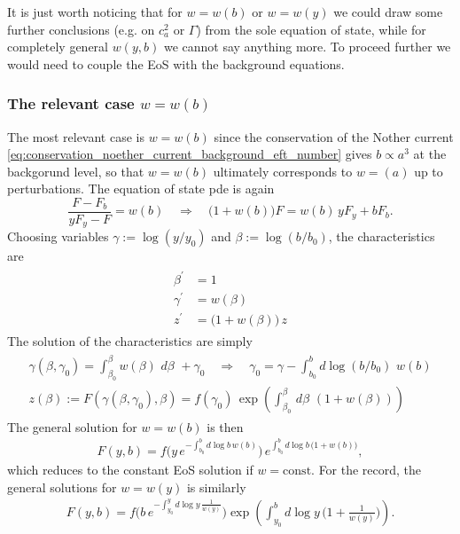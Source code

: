 It is just worth noticing that for $w=w(b)$ or $w=w(y)$ we could draw some further conclusions (e.g. on $c_a^2$ or $\Gamma$) from the sole equation of state, while  for completely general $w(y,b)$ we cannot say anything more.
To proceed further we would need to couple the EoS with the background equations.


\subsubsection{The relevant case $w=w(b)$}
%
The most relevant case is $w=w(b)$ since the conservation of the Nother current \eqref{eq:conservation_noether_current_background_eft_number} gives $b\propto a^3$ at the backgorund level, so that  $w=w(b)$ ultimately corresponds to $w=(a)$ up to perturbations.
The equation of state pde is again
\begin{equation}\label{eq:eos_pde_w_depending_b}
    \frac{F-F_b}{yF_y-F}=w(b)\quad\Rightarrow\quad \big(1+w(b)\big)F=w(b)\, yF_y+bF_b.
\end{equation}
Choosing variables $\gamma:=\log (y/y_0)$ and $\beta:=\log (b/b_0)$, the characteristics are
{\small
\begin{align}\label{eq:characteristics_eos_pde_w_depending_b}
\begin{aligned}
    \beta^\prime&=1\\
    \gamma^\prime&=w(\beta)\\
    z^\prime&=\big(1+w(\beta)\big)\,z
\end{aligned}\end{align}
}
The solution of the characteristics are simply 
{\small\begin{align}\label{eq:characteristics_eos_pde_solution_w_depending_b}
\begin{aligned}
    \gamma(\beta,\gamma_0)=\int_{\beta_0}^\beta w(\beta)\,\,d\beta\,\,+\gamma_0\quad\Rightarrow\quad \gamma_0=\gamma-\int_{b_0}^b \!\!d\log(b/b_0)\,\, w(b)\\
    z(\beta):=F(\gamma(\beta,\gamma_0),\beta)= f(\gamma_0)\,\exp\left(\int_{\beta_0}^\beta\, d\beta\,\,(1+w(\beta))\right)
\end{aligned}\end{align}}
The general solution for $w=w(b)$ is then
\begin{align}\label{eq:eos_pde_solution_w_depending_b}
    F(y,b)=f\Big(y\, e^{-\int_{b_0}^bd\log b\, w(b)}\Big)\, e^{\int_{b_0}^bd\log b\, \big(1+w(b)\big)},
\end{align}
which reduces to the constant EoS solution if $w=\text{const}$.
For the record, the general solutions for $w=w(y)$ is similarly 
\begin{align}
    F(y,b)=f\Big(b\, e^{-\int_{y_0}^yd\log y\, \frac{1}{w(y)}}\Big)\exp\left(\int_{y_0}^bd\log y\,\Big(1+\tfrac{1}{w(y)}\Big)\right).
\end{align}


